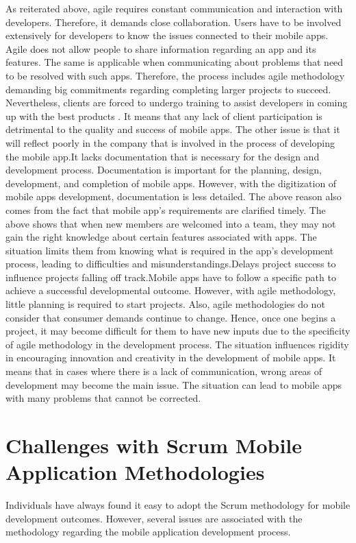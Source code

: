 \documentclass{article}
\begin{document}
As reiterated above, agile requires constant communication and interaction with developers. Therefore, it demands close collaboration. Users have to be involved extensively for developers to know the issues connected to their mobile apps. Agile does not allow people to share information regarding an app and its features. The same is applicable when communicating about problems that need to be resolved with such apps. Therefore, the process includes agile methodology demanding big commitments regarding completing larger projects to succeed. Nevertheless, clients are forced to undergo training to assist developers in coming up with the best products \cite{dimaReference}. It means that any lack of client participation is detrimental to the quality and success of mobile apps. The other issue is that it will reflect poorly in the company that is involved in the process of developing the mobile app.It lacks documentation that is necessary for the design and development process. Documentation is important for the planning, design, development, and completion of mobile apps. However, with the digitization of mobile apps development, documentation is less detailed. The above reason also comes from the fact that mobile app’s requirements are clarified timely. The above shows that when new members are welcomed into a team, they may not gain the right knowledge about certain features associated with apps. The situation limits them from knowing what is required in the app’s development process, leading to difficulties and misunderstandings.Delays project success to influence projects falling off track.Mobile apps have to follow a specific path to achieve a successful developmental outcome. However, with agile methodology, little planning is required to start projects. Also, agile methodologies do not consider that consumer demands continue to change. Hence, once one begins a project, it may become difficult for them to have new inputs due to the specificity of agile methodology in the development process\cite{dimaReference}. The situation influences rigidity in encouraging innovation and creativity in the development of mobile apps. It means that in cases where there is a lack of communication, wrong areas of development may become the main issue. The situation can lead to mobile apps with many problems that cannot be corrected. 
\section*{Challenges with Scrum Mobile Application Methodologies }
Individuals have always found it easy to adopt the Scrum methodology for mobile development outcomes. However, several issues are associated with the methodology regarding the mobile application development process. 
\end{document}
